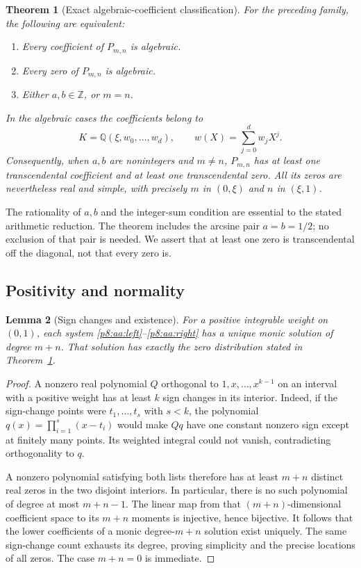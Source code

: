 \documentclass[11pt,a4paper]{article}
\newtheorem{theorem}{Theorem}[section]
\newtheorem{lemma}[theorem]{Lemma}
\theoremstyle{definition}
\theoremstyle{remark}
\numberwithin{equation}{section}
\begin{document}
\begin{theorem}[Exact algebraic-coefficient classification]
\label{p8:aa:main}
For the preceding family, the following are equivalent:
\begin{enumerate}
\item Every coefficient of $P_{m,n}$ is algebraic.
\item Every zero of $P_{m,n}$ is algebraic.
\item Either $a,b\in\mathbb Z$, or $m=n$.
\end{enumerate}
In the algebraic cases the coefficients belong to
\[
 K=\mathbb Q(\xi,w_0,\ldots,w_d),
 \qquad w(X)=\sum_{j=0}^d w_jX^j.
\]
Consequently, when $a,b$ are nonintegers and $m\ne n$,
$P_{m,n}$ has at least one transcendental coefficient and at least
one transcendental zero. All its zeros are nevertheless real and simple,
with precisely $m$ in $(0,\xi)$ and $n$ in $(\xi,1)$.
\end{theorem}

The rationality of $a,b$ and the integer-sum condition are essential to
the stated arithmetic reduction. The theorem includes the arcsine pair
$a=b=1/2$; no exclusion of that pair is needed. We assert that at least
one zero is transcendental off the diagonal, not that every zero is.

\subsection{Positivity and normality}

\begin{lemma}[Sign changes and existence]\label{p8:aa:normality}
For a positive integrable weight on $(0,1)$, each system
\eqref{p8:aa:left}--\eqref{p8:aa:right} has a unique monic solution of
degree $m+n$. That solution has exactly the zero distribution stated
in Theorem~\ref{p8:aa:main}.
\end{lemma}

\begin{proof}
A nonzero real polynomial $Q$ orthogonal to
$1,x,\ldots,x^{k-1}$ on an interval with a positive weight has at
least $k$ sign changes in its interior. Indeed, if the sign-change
points were $t_1,\ldots,t_s$ with $s<k$, the polynomial
$q(x)=\prod_{i=1}^s(x-t_i)$ would make $Qq$ have one constant
nonzero sign except at finitely many points. Its weighted integral
could not vanish, contradicting orthogonality to $q$.

A nonzero polynomial satisfying both lists therefore has at least
$m+n$ distinct real zeros in the two disjoint interiors. In particular,
there is no such polynomial of degree at most $m+n-1$. The linear map
from that $(m+n)$-dimensional coefficient space to its $m+n$ moments
is injective, hence bijective. It follows that the lower coefficients
of a monic degree-$m+n$ solution exist uniquely. The same sign-change
count exhausts its degree, proving simplicity and the precise locations
of all zeros. The case $m+n=0$ is immediate.
\end{proof}
\end{document}

